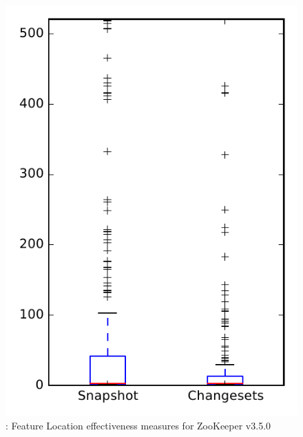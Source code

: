 
\begin{figure}
\centering
\includegraphics[height=0.4\textheight]{figures/flt/rq1_zookeeper}
\caption{\fone: Feature Location effectiveness measures for ZooKeeper v3.5.0}
\label{fig:flt:rq1:zookeeper}
\end{figure}
